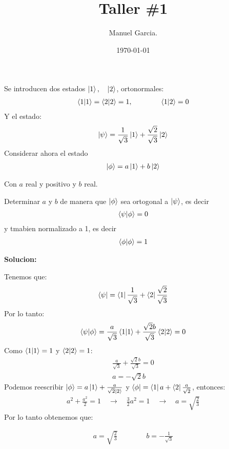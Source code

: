 \documentclass{article}
\title{Taller \#1}
\author{Manuel Garcia.}
\date{\today}
\newcommand{\caja}[3]{%
  \begin{tcolorbox}[colback=#1!5!white,colframe=#1!25!black,title=#2]
    #3
  \end{tcolorbox}%
}
\begin{document}
\maketitle

\section{}
Se introducen dos estados $ \ket{1 }, \quad \ket{2 } $, ortonormales: 
\begin{gather}
  \bra{1}\ket{1} = \bra{2}\ket{2} = 1 ,\qquad \qquad \bra{1}\ket{2 } = 0 
\end{gather}
Y el estado: 
\begin{gather}
  \ket{\psi } = \frac{1}{\sqrt{3 } }\ket{1 } + \frac{\sqrt{2 } }{\sqrt{3 } }\ket{2 }
\end{gather}
Considerar ahora el estado 
\begin{gather}
  \ket{\phi } = a \ket{1 } + b \ket{2 }
\end{gather}

Con $ a  $ real y positivo y $ b  $ real. 

Determinar $ a  $ y $ b  $ de manera que $ \ket{\phi } $ sea ortogonal a $ \ket{\psi } $, es decir 
\begin{gather}
  \bra{\psi }\ket{\phi  } = 0  
\end{gather}
y tmabien normalizado a 1, es decir 
\begin{gather}
  \bra{\phi }\ket{\phi } = 1  
\end{gather}

\textbf{Solucion: }

Tenemos que: 
\begin{gather*}
  \bra{\psi} = \bra{1 }\frac{1}{\sqrt{3 }  } + \bra{2 }\frac{\sqrt{2 } }{\sqrt{3 } }
\end{gather*}
Por lo tanto: 
\begin{gather*}
  \bra{\psi}\ket{\phi }  = \frac{a }{\sqrt{3 }  } \bra{1}\ket{1} + \frac{\sqrt{2 } b }{\sqrt{3 } }\bra{2}\ket{2}   = 0 
\end{gather*}
Como $ \bra{1}\ket{1 } = 1   $ y $ \bra{2}\ket{2}  =1 $:
\begin{gather*}
   \frac{a }{\sqrt{3 }  }  + \frac{\sqrt{2 } b }{\sqrt{3 } } = 0\\
   a = -\sqrt{2 } b
\end{gather*}
Podemos reescribir $ \ket{\phi } = a \ket{1 } + \frac{a }{\sqrt{2 } \ket{2 }} $ y $ \bra{\phi } = \bra{1 } a + \bra{2 } \frac{a }{\sqrt{2 } } $, entonces: 
\begin{gather*}
  a^2 + \frac{a^2 }{2 } =  1 \quad \rightarrow \quad \frac{3 }{2}a^2 = 1 \quad \rightarrow \quad a = \sqrt{\frac{2 }{3 }}  
\end{gather*}
Por lo tanto obtenemos que: 
\caja{red}{}{
  \begin{gather*}
    a = \sqrt{\frac{2 }{3 }} \qquad \qquad b = -\frac{1}{\sqrt{3 } } 
  \end{gather*}
}
\end{document}
